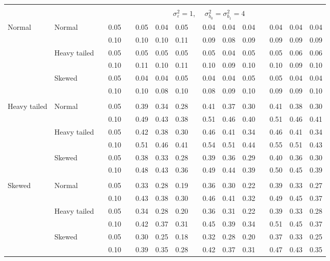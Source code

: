 \documentclass{article} %
\begin{document}
\begin{table}[ht]
\begin{scriptsize}
\begin{center}
\begin{tabular}{ll p{.1cm} c p{.1cm} rrr p{.1cm} rrr p{.1cm} rrr}
&&&&&&&&&&&&&&&\\
& && && \multicolumn{9}{c}{$\sigma_{\varepsilon}^2 = 1$, \ \ $\sigma_{b_0}^2 = \sigma_{b_1}^2 = 4$} \\ \cline{6-16}
\rowcolor{gray!20}Normal       & Normal       && 0.05 &&   0.05 & 0.04 & 0.05 && 0.04 & 0.04 & 0.04 &&   0.04 & 0.04 & 0.04 \\
\rowcolor{gray!20}             &              && 0.10 &&   0.10 & 0.10 & 0.11 && 0.09 & 0.08 & 0.09 &&   0.09 & 0.09 & 0.09 \\
\rowcolor{gray!20}             & Heavy tailed && 0.05 &&   0.05 & 0.05 & 0.05 && 0.05 & 0.04 & 0.05 &&   0.05 & 0.06 & 0.06 \\
\rowcolor{gray!20}             &              && 0.10 &&   0.11 & 0.10 & 0.11 && 0.10 & 0.09 & 0.10 &&   0.10 & 0.09 & 0.10 \\
\rowcolor{gray!20}             & Skewed       && 0.05 &&   0.04 & 0.04 & 0.05 && 0.04 & 0.04 & 0.05 &&   0.05 & 0.04 & 0.04 \\
\rowcolor{gray!20}             &              && 0.10 &&   0.10 & 0.08 & 0.10 && 0.08 & 0.09 & 0.10 &&   0.09 & 0.09 & 0.10 \\
             &&&&&&&&&&&&&&&\\
Heavy tailed & Normal       && 0.05 &&   0.39 & 0.34 & 0.28 && 0.41 & 0.37 & 0.30 &&  0.41 & 0.38 & 0.30 \\
             &              && 0.10 &&   0.49 & 0.43 & 0.38 && 0.51 & 0.46 & 0.40 &&  0.51 & 0.46 & 0.41 \\
             & Heavy tailed && 0.05 &&   0.42 & 0.38 & 0.30 && 0.46 & 0.41 & 0.34 &&  0.46 & 0.41 & 0.34 \\
             &              && 0.10 &&   0.51 & 0.46 & 0.41 && 0.54 & 0.51 & 0.44 &&  0.55 & 0.51 & 0.43 \\
             & Skewed       && 0.05 &&   0.38 & 0.33 & 0.28 && 0.39 & 0.36 & 0.29 &&  0.40 & 0.36 & 0.30 \\
             &              && 0.10 &&   0.48 & 0.43 & 0.36 && 0.49 & 0.44 & 0.39 &&  0.50 & 0.45 & 0.39 \\
             &&&&&&&&&&&&&&&\\
Skewed       & Normal       && 0.05 &&   0.33 & 0.28 & 0.19 && 0.36 & 0.30 & 0.22 &&  0.39 & 0.33 & 0.27 \\
             &              && 0.10 &&   0.43 & 0.38 & 0.30 && 0.46 & 0.41 & 0.32 &&  0.49 & 0.45 & 0.37 \\
             & Heavy tailed && 0.05 &&   0.34 & 0.28 & 0.20 && 0.36 & 0.31 & 0.22 &&  0.39 & 0.33 & 0.28 \\
             &              && 0.10 &&   0.42 & 0.37 & 0.31 && 0.45 & 0.39 & 0.34 &&  0.51 & 0.45 & 0.37 \\
             & Skewed       && 0.05 &&   0.30 & 0.25 & 0.18 && 0.32 & 0.28 & 0.20 &&  0.37 & 0.33 & 0.25 \\
             &              && 0.10 &&   0.39 & 0.35 & 0.28 && 0.42 & 0.37 & 0.31 &&  0.47 & 0.43 & 0.35 \\



\end{tabular}
\end{center}
\end{scriptsize}
\end{table}
\end{document}

